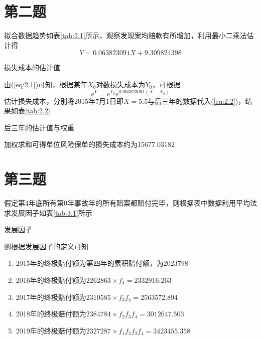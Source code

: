 \documentclass[a4paper,12pt]{ctexart}
\begin{document}
\section*{第二题}
拟合数据趋势如表\ref{tab:2.1}所示，观察发现案均赔款有所增加，利用最小二乘法估计得
\begin{equation}
    Y=0.063823091X+9.309824398\label{eq:2.1}
\end{equation}
\begin{table}[H]
    \centering
    \caption{损失成本的估计值}
    \label{tab:2.1}
\end{table}

由(\ref{eq:2.1})可知，根据某年$X_0$对数损失成本为$Y_0$，可根据
\begin{equation}
    e^Y=e^{Y_0}e^{0.063823091(X-X_0)}\label{eq:2.2}
\end{equation}
估计损失成本，分别将2015年7月1日即$X=5.5$与后三年的数据代入(\ref{eq:2.2})，结果如表\ref{tab:2.2}
\begin{table}[H]
    \centering
    \caption{后三年的估计值与权重}
    \label{tab:2.2}
\end{table}
加权求和可得单位风险保单的损失成本约为15677.03182
\section*{第三题}
假定第4年底所有第0年事故年的所有赔案都赔付完毕，则根据表中数据利用平均法求发展因子如表\ref{tab:3.1}所示
\begin{table}[H]
    \centering
    \caption{发展因子}
    \label{tab:3.1}
\end{table}
则根据发展因子的定义可知
\begin{enumerate}
    \item 2015年的终极赔付额为第四年的累积赔付额，为$2023798$
    \item 2016年的终极赔付额为$2262863\times f_4=2332916.263$
    \item 2017年的终极赔付额为$2310585\times f_3f_4=2563572.894$
    \item 2018年的终极赔付额为$2384784\times f_2f_3f_4=3012647.503$
    \item 2019年的终极赔付额为$2327287\times f_1f_2f_3f_4=3423455.358$
\end{enumerate}
\end{document}
